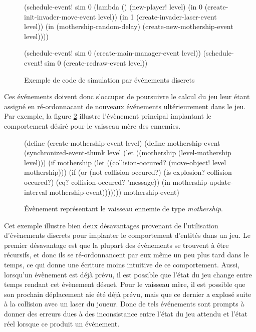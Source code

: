 \documentclass[12pt,oneside,letterpaper,francais]{book}
\begin{document}
\begin{figure}[htb!]
  \begin{schemecode}
(schedule-event! sim 0
  (lambda () (new-player! level)
             (in 0 (create-init-invader-move-event level))
             (in 1 (create-invader-laser-event level))
             (in (mothership-random-delay)
                 (create-new-mothership-event level))))
 
(schedule-event! sim 0 (create-main-manager-event level))
(schedule-event! sim 0 (create-redraw-event level))
  \end{schemecode}
  \caption{Exemple de code de simulation par événements discrets}
  \label{Exp:des}
\end{figure}

Ces événements doivent donc s'occuper de poursuivre le calcul du jeu
leur étant assigné en ré-ordonnacant de nouveaux événements
ultérieurement dans le jeu. Par exemple, la figure \ref{Exp:mother-ev}
illustre l'évènement principal implantant le comportement désiré pour
le vaisseau mère des ennemies.

\begin{figure}[htb!]
  \begin{schemecode}
(define (create-mothership-event level)
 (define mothership-event
   (synchronized-event-thunk level
     (let ((mothership (level-mothership level)))
       (if mothership
           (let ((collision-occured? (move-object! level mothership)))
             (if (or (not collision-occured?)
                     (is-explosion? collision-occured?)
                     (eq? collision-occured? 'message))
                 (in mothership-update-interval mothership-event)))))))
  mothership-event)
  \end{schemecode}
  \caption{Évènement représentant le vaisseau ennemie de type
    \textit{mothership}.}
  \label{Exp:mother-ev}
\end{figure}

Cet exemple illustre bien deux désavantages provenant de l'utilisation
d'évènements discrets pour implanter le comportement d'entités dans un
jeu. Le premier désavantage est que la plupart des évènements se
trouvent à être récursifs, et donc ils se ré-ordonnancent par eux même
un peu plus tard dans le temps, ce qui donne une écriture moins
intuitive de ce comportement. Aussi, lorsqu'un évènement est déjà
prévu, il est possible que l'état du jeu change entre temps rendant
cet évènement désuet. Pour le vaisseau mère, il est possible que son
prochain déplacement aie été déjà prévu, mais que ce dernier a explosé
suite à la collision avec un laser du joueur. Donc de tels événements
sont prompts à donner des erreurs dues à des inconsistance entre
l'état du jeu attendu et l'état réel lorsque ce produit un événement.
\end{document}
